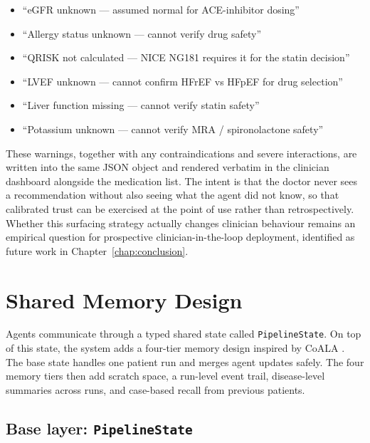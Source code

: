 \begin{itemize}
  \item ``eGFR unknown --- assumed normal for ACE-inhibitor dosing''
  \item ``Allergy status unknown --- cannot verify drug safety''
  \item ``QRISK not calculated --- NICE NG181 requires it for the
        statin decision''
  \item ``LVEF unknown --- cannot confirm HFrEF vs HFpEF for drug
        selection''
  \item ``Liver function missing --- cannot verify statin safety''
  \item ``Potassium unknown --- cannot verify MRA / spironolactone
        safety''
\end{itemize}

These warnings, together with any contraindications and severe
interactions, are written into the same JSON object and rendered
verbatim in the clinician dashboard alongside the medication list. The
intent is that the doctor never sees a recommendation without also
seeing what the agent did not know, so that calibrated trust
\cite{Bedi2025OptParadox} can be exercised at the point of use rather
than retrospectively. Whether this surfacing strategy actually changes
clinician behaviour remains an empirical question for prospective
clinician-in-the-loop deployment, identified as future work in
Chapter~\ref{chap:conclusion}.

\FloatBarrier
\section{Shared Memory Design}
\label{sec:shared_memory}

Agents communicate through a typed shared state called
\texttt{PipelineState}. On top of this state, the system adds a four-tier
memory design inspired by CoALA \cite{Sumers2024CoALA}. The base state handles
one patient run and merges agent updates safely. The four memory tiers then add
scratch space, a run-level event trail, disease-level summaries across runs,
and case-based recall from previous patients.

\subsection{Base layer: \texttt{PipelineState}}
\label{sec:pipeline_state}

